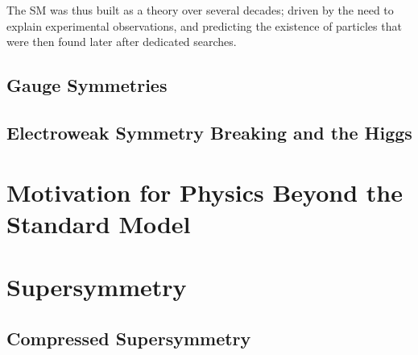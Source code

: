 %
The \ac{SM} was thus built as a theory over several decades; driven by the need to explain experimental observations, and predicting the existence of particles that were then found later after dedicated searches. 


\subsection{Gauge Symmetries \label{th:gauge}}

\subsection{Electroweak Symmetry Breaking and the Higgs\label{th:EW}}

\section{Motivation for Physics Beyond the Standard Model \label{th:BSM}}

\section{Supersymmetry \label{th:SUSY}}

\subsection{Compressed Supersymmetry \label{th:CMPsusy}}

